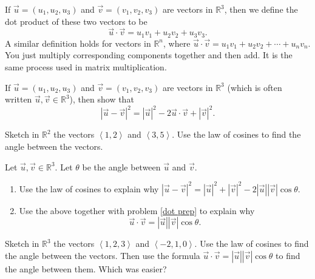 \begin{definition}
If $\vec u = (u_1,u_2,u_3)$ and $\vec v= (v_1,v_2,v_3)$ are vectors in $\mathbb{R}^3$, then we define the dot product of these two vectors to be 
$$\vec u\cdot \vec v = u_1 v_1+ u_2 v_2+ u_3 v_3.$$
A similar definition holds for vectors in $\mathbb{R}^n$, where
$\vec u\cdot \vec v = u_1 v_1+ u_2 v_2+\cdots+ u_n v_n.$
You just multiply corresponding components together and then add. It is the same process used in matrix multiplication.
\end{definition}

\begin{problem}\label{dot prep} 
If $\vec u = (u_1,u_2,u_3)$ and $\vec v= (v_1,v_2,v_3)$ are vectors in $\mathbb{R}^3$ (which is often written $\vec u,\vec v\in\mathbb{R}^3$), then show that 
$$|\vec u-\vec v|^2 = |\vec u|^2-2\vec u\cdot \vec v +|\vec v|^2.$$
\end{problem}

\begin{problem} 
Sketch in $\mathbb{R}^2$ the vectors $\left<1,2\right>$ and $\left<3,5\right>$.  Use the law of cosines to find the angle between the vectors.
\end{problem}


\begin{problem}\label{dot angle formula}  
Let $\vec u,\vec v\in\mathbb{R}^3$. Let $\theta$ be the angle between $\vec u$ and $\vec v$. 
\begin{enumerate}
\item Use the law of cosines to explain why $|\vec u-\vec v|^2=|\vec u|^2+|\vec v|^2-2|\vec u||\vec v|\cos\theta$.
\item Use the above together with problem \ref{dot prep} to explain why $$\vec u\cdot \vec v=|\vec u||\vec v|\cos\theta.$$
\end{enumerate}
\end{problem}

\begin{problem}\label{dot angle practice}  
Sketch in $\mathbb{R}^3$ the vectors $\left<1,2,3\right>$ and $\left<-2,1,0\right>$.  Use the law of cosines to find the angle between the vectors. Then use the formula $\vec u\cdot \vec v=|\vec u||\vec v|\cos\theta$ to find the angle between them. Which was easier?
\end{problem}

